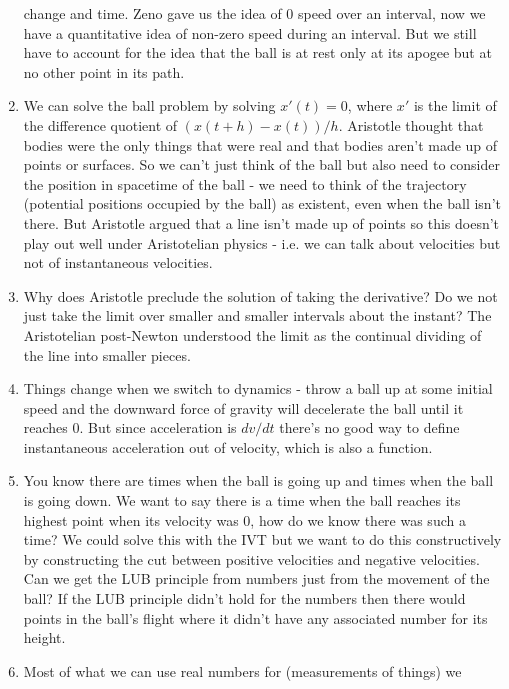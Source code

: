 \documentclass[12pt]{article}
\theoremstyle{definition}
\begin{document}
\begin{enumerate}
        change and time. Zeno gave us the idea of 0 speed over an interval, now
        we have a quantitative idea of non-zero speed during an interval. But
        we still have to account for the idea that the ball is at rest only at
        its apogee but at no other point in its path.
    \item 
        We can solve the ball problem by solving $x'(t) = 0$, where $x'$ is the
        limit of the difference quotient of $(x(t + h) - x(t))/h$. Aristotle
        thought that bodies were the only things that were real and that bodies
        aren't made up of points or surfaces. So we can't just think of the
        ball but also need to consider the position in spacetime of the ball -
        we need to think of the trajectory (potential positions occupied by the
        ball) as existent, even when the ball isn't there. But Aristotle argued
        that a line isn't made up of points so this doesn't play out well under
        Aristotelian physics - i.e. we can talk about velocities but not of
        instantaneous velocities.
    \item 
        Why does Aristotle preclude the solution of taking the derivative? Do
        we not just take the limit over smaller and smaller intervals about the
        instant? The Aristotelian post-Newton understood the limit as the
        continual dividing of the line into smaller pieces.
    \item
        Things change when we switch to dynamics - throw a ball up at some
        initial speed and the downward force of gravity will decelerate the
        ball until it reaches 0. But since acceleration is $dv/dt$ there's no
        good way to define instantaneous acceleration out of velocity, which is
        also a function.
    \item
        You know there are times when the ball is going up and times when the
        ball is going down. We want to say there is a time when the ball
        reaches its highest point when its velocity was 0, how do we know there
        was such a time? We could solve this with the IVT but we want to do
        this constructively by constructing the cut between positive velocities
        and negative velocities. Can we get the LUB principle from numbers just
        from the movement of the ball? If the LUB principle didn't hold for the
        numbers then there would points in the ball's flight where it didn't
        have any associated number for its height.
    \item 
        Most of what we can use real numbers for (measurements of things) we

\end{enumerate}
\end{document}
